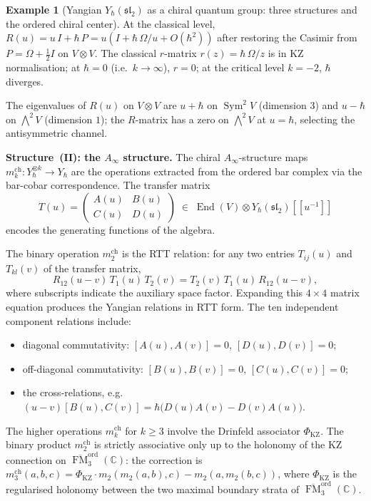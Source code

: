 \documentclass[11pt,reqno]{amsart}
\theoremstyle{definition}
\newtheorem{example}[theorem]{Example}
\theoremstyle{remark}
\newcommand{\Ainf}{A_{\infty}}
\DeclareMathOperator{\End}{End}
\DeclareMathOperator{\FM}{FM}
\newcommand{\CC}{\mathbb{C}}
\numberwithin{equation}{section}
\begin{document}
\begin{example}[Yangian $Y_\hbar(\mathfrak{sl}_2)$
as a chiral quantum group: three structures and the
ordered chiral center]
At the classical level, $R(u) = u\,I + \hbar\,P
= u(I + \hbar\,\Omega/u + O(\hbar^2))$
after restoring the Casimir from $P = \Omega + \tfrac{1}{2}I$
on $V \otimes V$. The classical $r$-matrix
$r(z) = \hbar\,\Omega/z$ is in KZ normalisation;
at $\hbar = 0$ (i.e.\ $k \to \infty$), $r = 0$;
at the critical level $k = -2$, $\hbar$ diverges.

The eigenvalues of $R(u)$ on $V \otimes V$ are
$u + \hbar$ on $\operatorname{Sym}^2 V$ (dimension $3$)
and $u - \hbar$ on $\bigwedge^2 V$ (dimension $1$);
the $R$-matrix has a zero on $\bigwedge^2 V$ at $u = \hbar$,
selecting the antisymmetric channel.

\medskip
\noindent
\textbf{Structure~(II): the $\Ainf$ structure.}
The chiral $\Ainf$-structure maps
$m_k^{\mathrm{ch}} \colon Y_\hbar^{\otimes k} \to Y_\hbar$
are the operations extracted from the ordered bar complex via
the bar-cobar correspondence. The transfer matrix
\begin{equation}\label{eq:yangian-transfer}
  T(u) =
  \begin{pmatrix} A(u) & B(u) \\ C(u) & D(u) \end{pmatrix}
  \;\in\; \End(V) \otimes Y_\hbar(\mathfrak{sl}_2)[\![u^{-1}]\!]
\end{equation}
encodes the generating functions of the algebra.

The binary operation $m_2^{\mathrm{ch}}$ is the RTT
relation: for any two entries $T_{ij}(u)$ and $T_{kl}(v)$
of the transfer matrix,
\begin{equation}\label{eq:yangian-rtt}
  R_{12}(u - v)\,T_1(u)\,T_2(v)
  = T_2(v)\,T_1(u)\,R_{12}(u - v),
\end{equation}
where subscripts indicate the auxiliary space factor.
Expanding this $4 \times 4$ matrix equation produces the
Yangian relations in RTT form. The ten independent
component relations include:
\begin{itemize}
\item diagonal commutativity: $[A(u), A(v)] = 0$,
  $[D(u), D(v)] = 0$;
\item off-diagonal commutativity: $[B(u), B(v)] = 0$,
  $[C(u), C(v)] = 0$;
\item the cross-relations, e.g.\
  $(u{-}v)[B(u), C(v)]
  = \hbar\bigl(D(u)A(v) - D(v)A(u)\bigr)$.
\end{itemize}

The higher operations $m_k^{\mathrm{ch}}$ for $k \geq 3$
involve the Drinfeld associator $\Phi_{\mathrm{KZ}}$. The
binary product $m_2^{\mathrm{ch}}$ is strictly associative
only up to the holonomy of the KZ connection on
$\overline{\FM}_3^{\mathrm{ord}}(\CC)$:
the correction is $m_3^{\mathrm{ch}}(a, b, c)
= \Phi_{\mathrm{KZ}} \cdot m_2(m_2(a,b), c)
- m_2(a, m_2(b,c))$, where $\Phi_{\mathrm{KZ}}$ is the
regularised holonomy between the two maximal boundary
strata of $\overline{\FM}_3^{\mathrm{ord}}(\CC)$.


\end{example}
\end{document}
